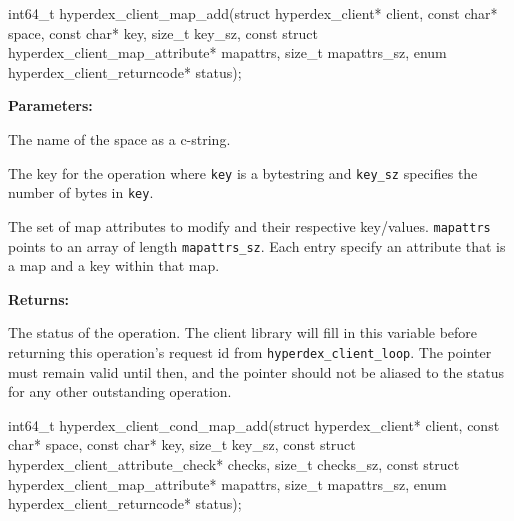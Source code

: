 \funcsep
{}
\begin{ccode}
int64_t hyperdex_client_map_add(struct hyperdex_client* client,
                const char* space,
                const char* key, size_t key_sz,
                const struct hyperdex_client_map_attribute* mapattrs, size_t mapattrs_sz,
                enum hyperdex_client_returncode* status);
\end{ccode}
\funcdesc 

\noindent\textbf{Parameters:}
\begin{description}[labelindent=\widthof{{\texttt{mapattrs}, \texttt{mapattrs\_sz}}},leftmargin=*,noitemsep,nolistsep,align=right]
\item[\texttt{space}] The name of the space as a c-string.
\item[\texttt{key}, \texttt{key\_sz}] The key for the operation where \texttt{key} is a bytestring and \texttt{key\_sz} specifies the number of bytes in \texttt{key}.
\item[\texttt{mapattrs}, \texttt{mapattrs\_sz}] The set of map attributes to modify and their respective key/values.  \texttt{mapattrs} points to an array of length \texttt{mapattrs\_sz}.  Each entry specify an attribute that is a map and a key within that map.
\end{description}

\noindent\textbf{Returns:}
\begin{description}[labelindent=\widthof{{\texttt{status}}},leftmargin=*,noitemsep,nolistsep,align=right]
\item[\texttt{status}] The status of the operation.  The client library will fill in this variable before returning this operation's request id from \texttt{hyperdex\_client\_loop}.  The pointer must remain valid until then, and the pointer should not be aliased to the status for any other outstanding operation.
\end{description}

\funcsep
{}
\begin{ccode}
int64_t hyperdex_client_cond_map_add(struct hyperdex_client* client,
                const char* space,
                const char* key, size_t key_sz,
                const struct hyperdex_client_attribute_check* checks, size_t checks_sz,
                const struct hyperdex_client_map_attribute* mapattrs, size_t mapattrs_sz,
                enum hyperdex_client_returncode* status);
\end{ccode}
\funcdesc 

